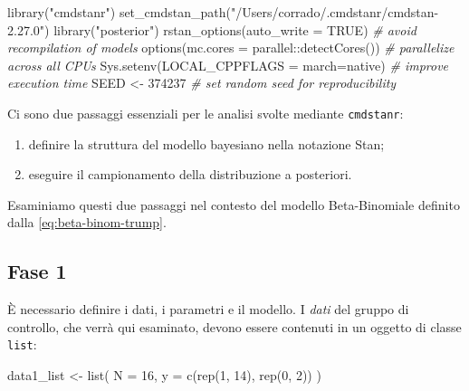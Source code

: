 \documentclass[
]{memoir}
\newenvironment{Shaded}{\begin{snugshade}}{\end{snugshade}}
\newcommand{\AttributeTok}[1]{\textcolor[rgb]{0.77,0.63,0.00}{#1}}
\newcommand{\CommentTok}[1]{\textcolor[rgb]{0.56,0.35,0.01}{\textit{#1}}}
\newcommand{\ConstantTok}[1]{\textcolor[rgb]{0.00,0.00,0.00}{#1}}
\newcommand{\DecValTok}[1]{\textcolor[rgb]{0.00,0.00,0.81}{#1}}
\newcommand{\FunctionTok}[1]{\textcolor[rgb]{0.00,0.00,0.00}{#1}}
\newcommand{\NormalTok}[1]{#1}
\newcommand{\OtherTok}[1]{\textcolor[rgb]{0.56,0.35,0.01}{#1}}
\newcommand{\SpecialCharTok}[1]{\textcolor[rgb]{0.00,0.00,0.00}{#1}}
\newcommand{\StringTok}[1]{\textcolor[rgb]{0.31,0.60,0.02}{#1}}
\providecommand{\tightlist}{%
  \setlength{\itemsep}{0pt}\setlength{\parskip}{0pt}}
\begin{document}
\begin{Shaded}
\begin{Highlighting}[]
\FunctionTok{library}\NormalTok{(}\StringTok{"cmdstanr"}\NormalTok{)}
\FunctionTok{set\_cmdstan\_path}\NormalTok{(}\StringTok{"/Users/corrado/.cmdstanr/cmdstan{-}2.27.0"}\NormalTok{)}
\FunctionTok{library}\NormalTok{(}\StringTok{"posterior"}\NormalTok{)}
\FunctionTok{rstan\_options}\NormalTok{(}\AttributeTok{auto\_write =} \ConstantTok{TRUE}\NormalTok{) }\CommentTok{\# avoid recompilation of models}
\FunctionTok{options}\NormalTok{(}\AttributeTok{mc.cores =}\NormalTok{ parallel}\SpecialCharTok{::}\FunctionTok{detectCores}\NormalTok{()) }\CommentTok{\# parallelize across all CPUs}
\FunctionTok{Sys.setenv}\NormalTok{(}\AttributeTok{LOCAL\_CPPFLAGS =} \StringTok{\textquotesingle{}{-}march=native\textquotesingle{}}\NormalTok{) }\CommentTok{\# improve execution time}
\NormalTok{SEED }\OtherTok{\textless{}{-}} \DecValTok{374237} \CommentTok{\# set random seed for reproducibility}
\end{Highlighting}
\end{Shaded}

Ci sono due passaggi essenziali per le analisi svolte mediante \texttt{cmdstanr}:

\begin{enumerate}
\def\labelenumi{\arabic{enumi}.}
\tightlist
\item
  definire la struttura del modello bayesiano nella notazione Stan;
\item
  eseguire il campionamento della distribuzione a posteriori.
\end{enumerate}

Esaminiamo questi due passaggi nel contesto del modello Beta-Binomiale definito dalla \eqref{eq:beta-binom-trump}.

\hypertarget{fase-1}{%
\subsection{Fase 1}\label{fase-1}}

È necessario definire i dati, i parametri e il modello. I \emph{dati} del gruppo di controllo, che verrà qui esaminato, devono essere contenuti in un oggetto di classe \texttt{list}:

\begin{Shaded}
\begin{Highlighting}[]
\NormalTok{data1\_list }\OtherTok{\textless{}{-}} \FunctionTok{list}\NormalTok{(}
  \AttributeTok{N =} \DecValTok{16}\NormalTok{,}
  \AttributeTok{y =} \FunctionTok{c}\NormalTok{(}\FunctionTok{rep}\NormalTok{(}\DecValTok{1}\NormalTok{, }\DecValTok{14}\NormalTok{), }\FunctionTok{rep}\NormalTok{(}\DecValTok{0}\NormalTok{, }\DecValTok{2}\NormalTok{))}
\NormalTok{)}
\end{Highlighting}
\end{Shaded}
\end{document}
